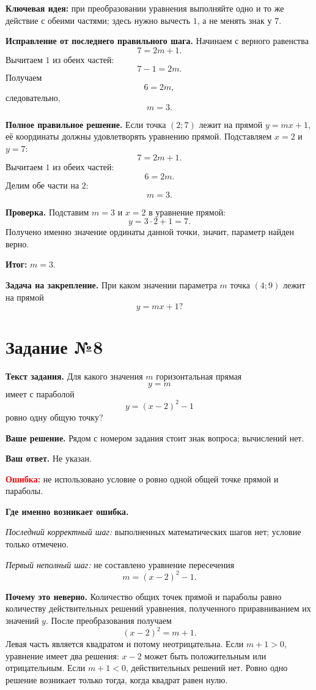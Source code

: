 \documentclass[12pt,a4paper]{article}
\begin{document}
\textcolor{blue!60!black}{\textbf{Ключевая идея:}} при преобразовании уравнения выполняйте одно и то же действие с обеими частями; здесь нужно вычесть $1$, а не менять знак у $7$.

\textbf{Исправление от последнего правильного шага.}
Начинаем с верного равенства
\[
7=2m+1.
\]
Вычитаем $1$ из обеих частей:
\[
7-1=2m.
\]
Получаем
\[
6=2m,
\]
следовательно,
\[
m=3.
\]

\textbf{Полное правильное решение.}
Если точка $(2;7)$ лежит на прямой $y=mx+1$, её координаты должны удовлетворять уравнению прямой. Подставляем $x=2$ и $y=7$:
\[
7=2m+1.
\]
Вычитаем $1$ из обеих частей:
\[
6=2m.
\]
Делим обе части на $2$:
\[
m=3.
\]

\textbf{Проверка.}
Подставим $m=3$ и $x=2$ в уравнение прямой:
\[
y=3\cdot 2+1=7.
\]
Получено именно значение ординаты данной точки, значит, параметр найден верно.

\textcolor{teal!60!black}{\textbf{Итог:}} $m=3$.

\textbf{Задача на закрепление.}
При каком значении параметра $m$ точка $(4;9)$ лежит на прямой
\[
y=mx+1?
\]

\newpage
{}\label{task:8}
\section*{Задание №8}

\textbf{Текст задания.}
Для какого значения $m$ горизонтальная прямая
\[
y=m
\]
имеет с параболой
\[
y=(x-2)^2-1
\]
ровно одну общую точку?

\textbf{Ваше решение.}
Рядом с номером задания стоит знак вопроса; вычислений нет.

\textbf{Ваш ответ.}
Не указан.

\textcolor{red}{\textbf{Ошибка:}} не использовано условие о ровно одной общей точке прямой и параболы.

\textbf{Где именно возникает ошибка.}

\emph{Последний корректный шаг:} выполненных математических шагов нет; условие только отмечено.

\emph{Первый неполный шаг:} не составлено уравнение пересечения
\[
m=(x-2)^2-1.
\]

\textbf{Почему это неверно.}
Количество общих точек прямой и параболы равно количеству действительных решений уравнения, полученного приравниванием их значений $y$. После преобразования получаем
\[
(x-2)^2=m+1.
\]
Левая часть является квадратом и потому неотрицательна. Если $m+1>0$, уравнение имеет два решения: $x-2$ может быть положительным или отрицательным. Если $m+1<0$, действительных решений нет. Ровно одно решение возникает только тогда, когда квадрат равен нулю.
\end{document}
